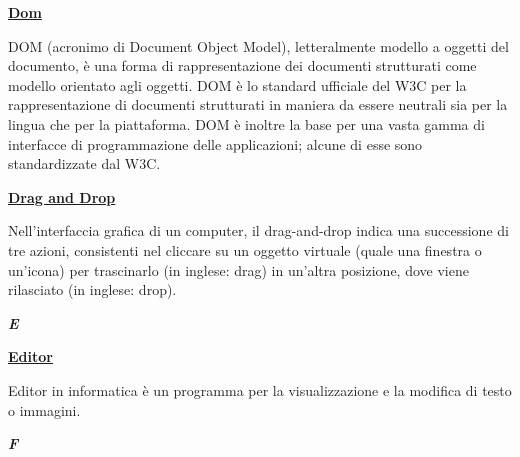 \bigskip
\begin{addmargin}[0em]{0em}	
	\textbf{\underline{Dom}}
\end{addmargin}
	
\medskip
\begin{addmargin}[5em]{1em}	
	DOM (acronimo di Document Object Model), letteralmente modello a oggetti del documento, è una forma di rappresentazione dei documenti strutturati come modello orientato agli oggetti.
DOM è lo standard ufficiale del W3C per la rappresentazione di documenti strutturati in maniera da essere neutrali sia per la lingua che per la piattaforma. DOM è inoltre la base per una vasta gamma di interfacce di programmazione delle applicazioni; alcune di esse sono standardizzate dal W3C.
\end{addmargin}	

\bigskip
\begin{addmargin}[0em]{0em}	
	\textbf{\underline{Drag and Drop}}
\end{addmargin}
	
\medskip
\begin{addmargin}[5em]{1em}	
Nell'interfaccia grafica di un computer, il drag-and-drop indica una successione di tre azioni, consistenti nel cliccare su un oggetto virtuale (quale una finestra o un'icona) per trascinarlo (in inglese: drag) in un'altra posizione, dove viene rilasciato (in inglese: drop).
\end{addmargin}	
	
\newpage

\cleardoublepage
{}
{}
\noindent\hrulefill\hspace{4mm}\textbf{\textsl{\Huge{E}}}\hspace{4mm}\hrulefill
\vspace*{2\bigskipamount}

\begin{addmargin}[0em]{0em}
	\textbf{\underline{Editor}} 
\end{addmargin}
	
\medskip
\begin{addmargin}[5em]{1em}	
Editor in informatica è un programma per la visualizzazione e la modifica di testo o immagini.
\end{addmargin}

\newpage

\cleardoublepage
{}
{}
\noindent\hrulefill\hspace{4mm}\textbf{\textsl{\Huge{F}}}\hspace{4mm}\hrulefill
\vspace*{2\bigskipamount}

